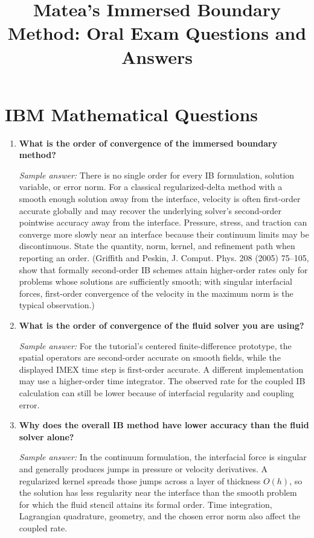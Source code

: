 \documentclass[11pt]{article}
\title{Matea's Immersed Boundary Method: Oral Exam Questions and Answers}
\author{}
\date{}
\begin{document}
\maketitle

\section*{IBM Mathematical Questions}

\begin{enumerate}[label=\arabic*.]

\item \textbf{What is the order of convergence of the immersed boundary method?}

\textit{Sample answer:}  
There is no single order for every IB formulation, solution variable, or error norm. For a classical regularized-delta method with a smooth enough solution away from the interface, velocity is often first-order accurate globally and may recover the underlying solver's second-order pointwise accuracy away from the interface. Pressure, stress, and traction can converge more slowly near an interface because their continuum limits may be discontinuous. State the quantity, norm, kernel, and refinement path when reporting an order. (Griffith and Peskin, J. Comput. Phys. 208 (2005) 75--105, show that formally second-order IB schemes attain higher-order rates only for problems whose solutions are sufficiently smooth; with singular interfacial forces, first-order convergence of the velocity in the maximum norm is the typical observation.)

\item \textbf{What is the order of convergence of the fluid solver you are using?}

\textit{Sample answer:}  
For the tutorial's centered finite-difference prototype, the spatial operators are second-order accurate on smooth fields, while the displayed IMEX time step is first-order accurate. A different implementation may use a higher-order time integrator. The observed rate for the coupled IB calculation can still be lower because of interfacial regularity and coupling error.

\item \textbf{Why does the overall IB method have lower accuracy than the fluid solver alone?}

\textit{Sample answer:}  
In the continuum formulation, the interfacial force is singular and generally produces jumps in pressure or velocity derivatives. A regularized kernel spreads those jumps across a layer of thickness $O(h)$, so the solution has less regularity near the interface than the smooth problem for which the fluid stencil attains its formal order. Time integration, Lagrangian quadrature, geometry, and the chosen error norm also affect the coupled rate.


\end{enumerate}
\end{document}
